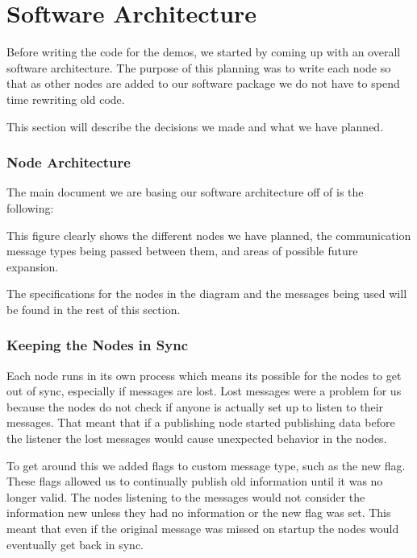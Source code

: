 \part{Software Architecture}

Before writing the code for the demos, we started by coming up with an
overall software architecture.  The purpose of this planning was to
write each node so that as other nodes are added to our software
package we do not have to spend time rewriting old code.

This section will describe the decisions we made and what we have
planned.

\section{Node Architecture}

The main document we are basing our software architecture off of is
the following:

\FloatBarrier
{}
\FloatBarrier


This figure clearly shows the different nodes we have planned, the
communication message types being passed between them, and areas of
possible future expansion.

The specifications for the nodes in the diagram and the messages being
used will be found in the rest of this section.



\section{Keeping the Nodes in Sync}

Each node runs in its own process which means its possible for the nodes to get out of sync, especially if messages are lost. Lost messages were a problem for us because the nodes do not check if anyone is actually set up to listen to their messages. That meant that if a publishing node started publishing data before the listener the lost messages would cause unexpected behavior in the nodes.

To get around this we added flags to custom message type, such as the new flag. These flags allowed us to continually publish old information until it was no longer valid. The nodes listening to the messages would not consider the information new unless they had no information or the new flag was set. This meant that even if the original message was missed on startup the nodes would eventually get back in sync.

